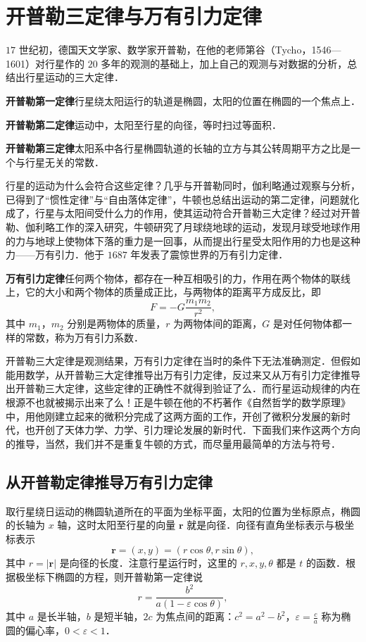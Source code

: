 \section{开普勒三定律与万有引力定律}\label{sec:8-4}

$17$ 世纪初，德国天文学家、数学家开普勒，在他的老师第谷（Tycho，1546---1601）对行星作的 $20$ 多年的观测的基础上，加上自己的观测与对数据的分析，总结出行星运动的三大定律．

\textbf{开普勒第一定律}\quad 行星绕太阳运行的轨道是椭圆，太阳的位置在椭圆的一个焦点上．

\textbf{开普勒第二定律}\quad 运动中，太阳至行星的向径，等时扫过等面积．

\textbf{开普勒第三定律}\quad 太阳系中各行星椭圆轨道的长轴的立方与其公转周期平方之比是一个与行星无关的常数．

行星的运动为什么会符合这些定律？几乎与开普勒同时，伽利略通过观察与分析，已得到了``惯性定律''与``自由落体定律''，牛顿也总结出运动的第二定律，问题就化成了，行星与太阳间受什么力的作用，使其运动符合开普勒三大定律？经过对开普勒、伽利略工作的深入研究，牛顿研究了月球绕地球的运动，发现月球受地球作用的力与地球上使物体下落的重力是一回事，从而提出行星受太阳作用的力也是这种力------万有引力．他于 $1687$ 年发表了震惊世界的万有引力定律．

\textbf{万有引力定律}\quad 任何两个物体，都存在一种互相吸引的力，作用在两个物体的联线上，它的大小和两个物体的质量成正比，与两物体的距离平方成反比，即
\[
F = -G\frac{m_1 m_2}{r^2},
\]
其中 $m_1$，$m_2$ 分别是两物体的质量，$r$ 为两物体间的距离，$G$ 是对任何物体都一样的常数，称为万有引力系数．

开普勒三大定律是观测结果，万有引力定律在当时的条件下无法准确测定．但假如能用数学，从开普勒三大定律推导出万有引力定律，反过来又从万有引力定律推导出开普勒三大定律，这些定律的正确性不就得到验证了么．而行星运动规律的内在根源不也就被揭示出来了么！正是牛顿在他的不朽著作《自然哲学的数学原理》中，用他刚建立起来的微积分完成了这两方面的工作，开创了微积分发展的新时代，也开创了天体力学、力学、引力理论发展的新时代．下面我们来作这两个方向的推导，当然，我们并不是重复牛顿的方式，而尽量用最简单的方法与符号．

\subsection{从开普勒定律推导万有引力定律}

取行星绕日运动的椭圆轨道所在的平面为坐标平面，太阳的位置为坐标原点，椭圆的长轴为 $x$ 轴，这时太阳至行星的向量 $\boldsymbol{r}$ 就是向径．向径有直角坐标表示与极坐标表示
\[
\boldsymbol{r} = (x,y) = (r\cos\theta, r\sin\theta),
\]
其中 $r = |\boldsymbol{r}|$ 是向径的长度．注意行星运行时，这里的 $r, x, y, \theta$ 都是 $t$ 的函数．根据极坐标下椭圆的方程，则开普勒第一定律说
\[
r = \frac{b^2}{a(1 - \varepsilon\cos\theta)},
\]
其中 $a$ 是长半轴，$b$ 是短半轴，$2c$ 为焦点间的距离：$c^2 = a^2 - b^2$，$\varepsilon = \frac{c}{a}$ 称为椭圆的偏心率，$0 < \varepsilon < 1$．

